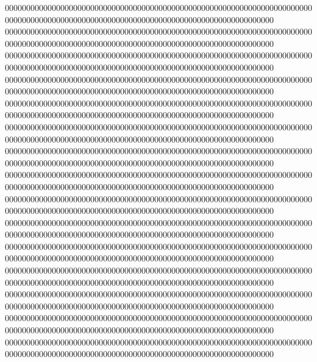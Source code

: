 000000000000000000000000000000000000000000000000000000000000000000000000000000000000000000000000000000000000000000000000000000000000000
000000000000000000000000000000000000000000000000000000000000000000000000000000000000000000000000000000000000000000000000000000000000000
000000000000000000000000000000000000000000000000000000000000000000000000000000000000000000000000000000000000000000000000000000000000000
000000000000000000000000000000000000000000000000000000000000000000000000000000000000000000000000000000000000000000000000000000000000000
000000000000000000000000000000000000000000000000000000000000000000000000000000000000000000000000000000000000000000000000000000000000000
000000000000000000000000000000000000000000000000000000000000000000000000000000000000000000000000000000000000000000000000000000000000000
000000000000000000000000000000000000000000000000000000000000000000000000000000000000000000000000000000000000000000000000000000000000000
000000000000000000000000000000000000000000000000000000000000000000000000000000000000000000000000000000000000000000000000000000000000000
000000000000000000000000000000000000000000000000000000000000000000000000000000000000000000000000000000000000000000000000000000000000000
000000000000000000000000000000000000000000000000000000000000000000000000000000000000000000000000000000000000000000000000000000000000000
000000000000000000000000000000000000000000000000000000000000000000000000000000000000000000000000000000000000000000000000000000000000000
000000000000000000000000000000000000000000000000000000000000000000000000000000000000000000000000000000000000000000000000000000000000000
000000000000000000000000000000000000000000000000000000000000000000000000000000000000000000000000000000000000000000000000000000000000000
000000000000000000000000000000000000000000000000000000000000000000000000000000000000000000000000000000000000000000000000000000000000000
000000000000000000000000000000000000000000000000000000000000000000000000000000000000000000000000000000000000000000000000000000000000000
